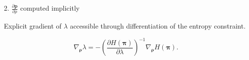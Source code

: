 \documentclass[10pt]{beamer}
\begin{document}
\begin{frame}{2. $\frac{\partial \mathbf{p}}{\partial \rho}$ computed implicitly}

Explicit gradient of $\lambda$ accessible through differentiation of the entropy constraint.

    \begin{equation}
    \nabla_{\bm{\rho}} \lambda =  -\left( \frac{\partial  H(\bm{\pi})}{\partial \lambda}\right)^{-1} \nabla_{\bm{\rho}} H (\bm{\pi}) .
\label{eq:gradientimplicit}
\end{equation}
\end{frame}



    
    
\end{document}
